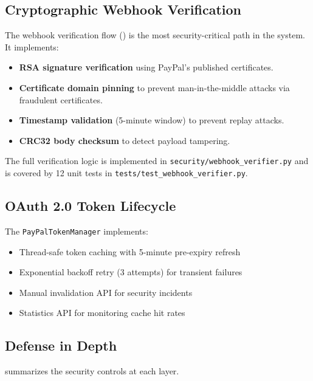 \documentclass[11pt,a4paper]{article}
\begin{document}
\subsection{Cryptographic Webhook Verification}
\label{subsec:webhook-security}

The webhook verification flow () is the most security-critical path in the system. It implements:

\begin{itemize}[leftmargin=*]
  \item \textbf{RSA signature verification} using PayPal's published certificates.
  \item \textbf{Certificate domain pinning} to prevent man-in-the-middle attacks via fraudulent certificates.
  \item \textbf{Timestamp validation} (5-minute window) to prevent replay attacks.
  \item \textbf{CRC32 body checksum} to detect payload tampering.
\end{itemize}

The full verification logic is implemented in \texttt{security/webhook\_verifier.py} and is covered by 12 unit tests in \texttt{tests/test\_webhook\_verifier.py}.

\subsection{OAuth 2.0 Token Lifecycle}
\label{subsec:oauth}

The \texttt{PayPalTokenManager} implements:
\begin{itemize}[leftmargin=*]
  \item Thread-safe token caching with 5-minute pre-expiry refresh
  \item Exponential backoff retry (3 attempts) for transient failures
  \item Manual invalidation API for security incidents
  \item Statistics API for monitoring cache hit rates
\end{itemize}

\subsection{Defense in Depth}
\label{subsec:defense}

 summarizes the security controls at each layer.
\end{document}
